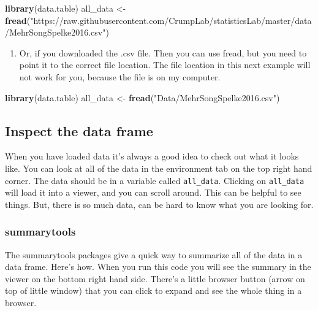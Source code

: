 \documentclass[]{book}
\newenvironment{Shaded}{\begin{snugshade}}{\end{snugshade}}
\newcommand{\KeywordTok}[1]{\textcolor[rgb]{0.13,0.29,0.53}{\textbf{{#1}}}}
\newcommand{\StringTok}[1]{\textcolor[rgb]{0.31,0.60,0.02}{{#1}}}
\newcommand{\NormalTok}[1]{{#1}}
\providecommand{\tightlist}{%
  \setlength{\itemsep}{0pt}\setlength{\parskip}{0pt}}
\theoremstyle{definition}
\theoremstyle{definition}
\theoremstyle{definition}
\theoremstyle{remark}
\begin{document}
\begin{Shaded}
\begin{Highlighting}[]
\KeywordTok{library}\NormalTok{(data.table)}
\NormalTok{all_data <-}\StringTok{ }\KeywordTok{fread}\NormalTok{(}\StringTok{"https://raw.githubusercontent.com/CrumpLab/statisticsLab/master/data/MehrSongSpelke2016.csv"}\NormalTok{)}
\end{Highlighting}
\end{Shaded}

\begin{enumerate}
\def\labelenumi{\arabic{enumi}.}
\setcounter{enumi}{1}
\tightlist
\item
  Or, if you downloaded the .csv file. Then you can use fread, but you
  need to point it to the correct file location. The file location in
  this next example will not work for you, because the file is on my
  computer.
\end{enumerate}

\begin{Shaded}
\begin{Highlighting}[]
\KeywordTok{library}\NormalTok{(data.table)}
\NormalTok{all_data <-}\StringTok{ }\KeywordTok{fread}\NormalTok{(}\StringTok{"Data/MehrSongSpelke2016.csv"}\NormalTok{)}
\end{Highlighting}
\end{Shaded}

\subsection{Inspect the data frame}\label{inspect-the-data-frame}

When you have loaded data it's always a good idea to check out what it
looks like. You can look at all of the data in the environment tab on
the top right hand corner. The data should be in a variable called
\texttt{all\_data}. Clicking on \texttt{all\_data} will load it into a
viewer, and you can scroll around. This can be helpful to see things.
But, there is so much data, can be hard to know what you are looking
for.

\subsubsection{summarytools}\label{summarytools}

The summarytools packages give a quick way to summarize all of the data
in a data frame. Here's how. When you run this code you will see the
summary in the viewer on the bottom right hand side. There's a little
browser button (arrow on top of little window) that you can click to
expand and see the whole thing in a browser.
\end{document}

